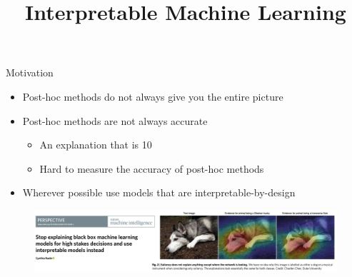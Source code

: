 \documentclass[11pt,compress,t,notes=noshow, aspectratio=169, xcolor=table]{beamer}
\title{Interpretable Machine Learning}
\date{}
\begin{document}
	\graphicspath{ {./figure/} }

 
\newcommand{\titlefigure}{figure/bild2}
\newcommand{\learninggoals}{
\item TBA
\item TBA
\item TBA}



\begin{frame}{Motivation}
    \begin{itemize}
        \item Post-hoc methods do not always give you the entire picture
        \item Post-hoc methods are not always accurate
        \begin{itemize}
            \item An explanation that is 10%
            \item Hard to measure the accuracy of post-hoc methods
        \end{itemize}
        \item Wherever possible use models that are interpretable-by-design
    \end{itemize}
    \begin{figure}
        \centering
        \includegraphics[scale=.4]{bild1}
    \end{figure}
\end{frame}
\end{document}
